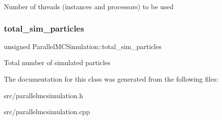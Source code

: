 Number of threads (instances and processors) to be used \mbox{\label{class_parallel_m_c_simulation_a18326e05c32fac82264d7351d78a7433}} 
\subsubsection{\texorpdfstring{total\+\_\+sim\+\_\+particles}{total\_sim\_particles}}
{\footnotesize\ttfamily unsigned Parallel\+M\+C\+Simulation\+::total\+\_\+sim\+\_\+particles}

Total number of simulated particles 

The documentation for this class was generated from the following files\+:\begin{DoxyCompactItemize}
\item 
src/parallelmcsimulation.\+h\item 
src/parallelmcsimulation.\+cpp\end{DoxyCompactItemize}
